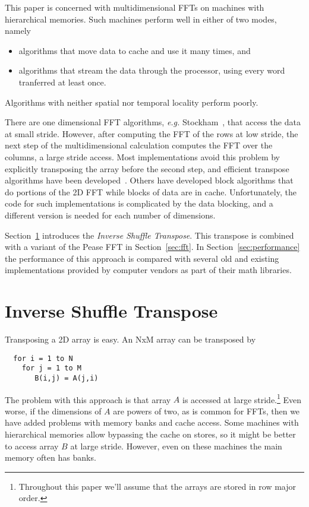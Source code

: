 \documentclass{article}
\begin{document}
This paper is concerned with multidimensional FFTs on machines with
hierarchical memories.  Such machines perform well in either of two
modes, namely

\begin{itemize}
  \item algorithms that move data to cache and use it many times, and
  \item algorithms that stream the data through the processor, using
    every word tranferred at least once.
\end{itemize}
%
Algorithms with neither spatial nor temporal locality perform poorly.

There are one dimensional FFT algorithms, {\em e.g.}
Stockham~\cite{vanloan}, that access the data at small stride.
However, after computing the FFT of the rows at low stride, the next
step of the multidimensional calculation computes the FFT over the
columns, a large stride access.  Most implementations avoid this
problem by explicitly transposing the array before the second step,
and efficient transpose algorithms have been developed~\cite{vanloan}.
Others have developed block algorithms that do portions of the 2D FFT
while blocks of data are in cache.  Unfortunately, the code for such
implementations is complicated by the data blocking, and a different
version is needed for each number of dimensions.

Section~\ref{sec:transpose} introduces the {\em Inverse Shuffle
Transpose}.  This transpose is combined with a variant of the Pease
FFT in Section~\ref{sec:fft}.  In Section~\ref{sec:performance} the
performance of this approach is compared with several old and existing
implementations provided by computer vendors as part of their math
libraries.

\section{Inverse Shuffle Transpose}
\label{sec:transpose}

Transposing a 2D array is easy.  An NxM array can be transposed by

\begin{verbatim}
  for i = 1 to N
    for j = 1 to M
       B(i,j) = A(j,i)
\end{verbatim}
%
The problem with this approach is that array $A$ is accessed at large
stride.\footnote{Throughout this paper we'll assume that the arrays
are stored in row major order.}  Even worse, if the dimensions of $A$
are powers of two, as is common for FFTs, then we have added problems
with memory banks and cache access.  Some machines with hierarchical
memories allow bypassing the cache on stores, so it might be better to
access array $B$ at large stride.  However, even on these machines the
main memory often has banks.
\end{document}
